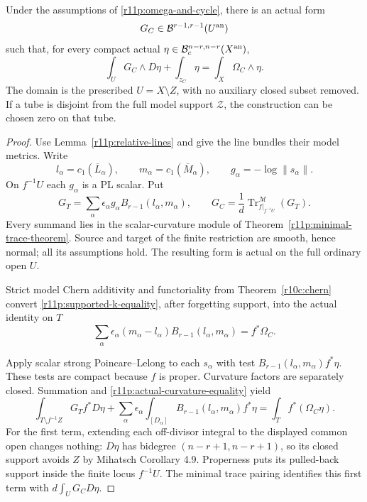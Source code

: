 \begin{theorem}
\label{r11p:complex-green}
Under the assumptions of \eqref{r11p:omega-and-cycle}, there is an
actual form
\[
                       G_C\in\mathcal B^{r-1,r-1}(U^{\rm an})
\]
such that, for every compact actual
$\eta\in\mathcal B_c^{n-r,n-r}(X^{\rm an})$,
\[
                 \int_UG_C\wedge D\eta+\int_{z_C}\eta
                                     =\int_X\Omega_C\wedge\eta.
\tag{PC7}\label{r11p:complex-green-equation}
\]
The domain is the prescribed $U=X\setminus Z$, with no auxiliary
closed subset removed.  If a tube is disjoint from the full model
support $\mathcal Z$, the construction can be chosen zero on that tube.
\end{theorem}

\begin{proof}
Use Lemma~\ref{r11p:relative-lines} and give the line bundles their
model metrics.  Write
\[
 l_\alpha=c_1(\overline L_\alpha),\qquad
 m_\alpha=c_1(\overline M_\alpha),\qquad
 g_\alpha=-\log\|s_\alpha\|.
\]
On $f^{-1}U$ each $g_\alpha$ is a PL scalar.  Put
\[
       G_T=\sum_\alpha\epsilon_\alpha
                    g_\alpha B_{r-1}(l_\alpha,m_\alpha),
       \qquad
       G_C=\frac1d\operatorname{Tr}^{\mathscr M}_{f|_{f^{-1}U}}(G_T).
\tag{PC8}\label{r11p:complex-green-formula}
\]
Every summand lies in the scalar-curvature module of
Theorem~\ref{r11p:minimal-trace-theorem}.  Source and target of the
finite restriction are smooth, hence normal; all its assumptions hold.
The resulting form is actual on the full ordinary open $U$.

Strict model Chern additivity and functoriality from Theorem~\ref{r10c:chern} convert
\eqref{r11p:supported-k-equality}, after forgetting support, into
the actual identity on $T$
\[
 \sum_\alpha\epsilon_\alpha
             (m_\alpha-l_\alpha)B_{r-1}(l_\alpha,m_\alpha)
                                      =f^*\Omega_C.
\tag{PC9}\label{r11p:actual-curvature-equality}
\]


Apply scalar strong Poincare--Lelong to each $s_\alpha$ with test
$B_{r-1}(l_\alpha,m_\alpha)f^*\eta$.  These tests are compact because
$f$ is proper.  Curvature factors are separately closed.  Summation
and \eqref{r11p:actual-curvature-equality} yield
\[
 \int_{T\setminus f^{-1}Z}G_Tf^*D\eta
 +\sum_\alpha\epsilon_\alpha
       \int_{[D_\alpha]}B_{r-1}(l_\alpha,m_\alpha)f^*\eta
                         =\int_Tf^*(\Omega_C\eta).
\tag{PC10}\label{r11p:upstairs-complex-PL}
\]
For the first term, extending each off-divisor integral to the
displayed common open changes nothing: $D\eta$ has bidegree
$(n-r+1,n-r+1)$, so its closed support avoids $Z$ by
Mihatsch Corollary 4.9.  Properness puts its pulled-back support
inside the finite locus $f^{-1}U$.  The minimal trace pairing identifies
this first term with $d\int_UG_CD\eta$.


\end{proof}
